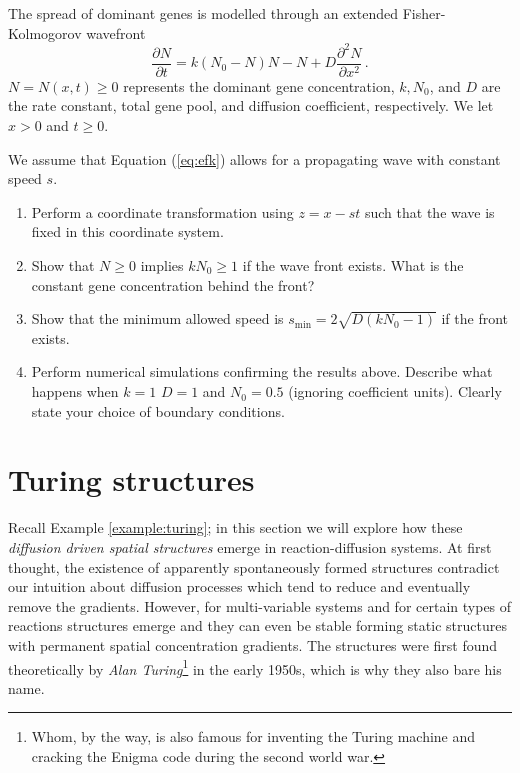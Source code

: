 \begin{exerciseregion}
	\begin{exploration}
	  The spread of dominant genes is modelled through an extended 
	  Fisher-Kolmogorov wavefront
	  \begin{equation}
		\label{eq:efk}
		\frac{\partial N}{\partial t} = k(N_0-N)N - N + D
		\frac{\partial^2N}{\partial x^2} \, .
	  \end{equation}
	  $N=N(x,t) \geq 0$ represents the dominant gene concentration, $k, N_0$, and
	  $D$ are the rate constant, total gene pool, and diffusion coefficient,
	  respectively. We let $x > 0$ and $t \geq 0$.

	  We assume that Equation (\ref{eq:efk}) allows for a
	  propagating wave with constant speed $s$. 
	  \begin{enumerate}
	  \item Perform a coordinate transformation using $z=x-st$ such that the
		wave is fixed in this coordinate system.
	  \item Show that $N \geq 0$ implies $kN_0 \geq 1$ if the wave front
		exists. What is the constant gene concentration behind the front?
	  \item Show that the minimum allowed speed is 
		$s_{\text{min}}=2\sqrt{D(kN_0-1)}$ if the front exists.
	  \item Perform numerical simulations confirming the results
		above. Describe what happens when $k=1$ $D=1$ and $N_0=0.5$
		(ignoring coefficient units). Clearly state your choice of boundary
		conditions.
	  \end{enumerate}
	\end{exploration}
\end{exerciseregion}


\section{Turing structures}
Recall Example \ref{example:turing}; in this section we will explore 
how these \emph{diffusion driven spatial structures} emerge in reaction-diffusion systems. 
At first thought, the existence of apparently spontaneously formed
structures contradict our intuition about diffusion processes which tend to reduce and eventually remove the gradients.  
However, for multi-variable systems and for certain types of reactions  
structures emerge and they can even be stable forming static structures with permanent  
spatial concentration gradients. The structures were first found theoretically by 
\emph{Alan Turing}\footnote{Whom, by the way, is also famous for inventing the 
Turing machine and cracking the Enigma code during the second world war.} in the early 1950s, 
which is why they also bare his name. 


